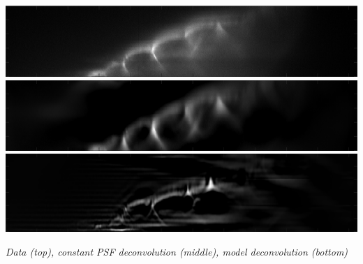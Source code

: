 \documentclass[a0paper,portrait,fontscale=0.35]{baposter}
\newcommand{\mycaption}[1]{
  {
    \smaller
    \emph{#1}
  }
}
\theoremstyle{plain}
\theoremstyle{plain}
\theoremstyle{definition}
\theoremstyle{plain}
\theoremstyle{definition}
\begin{document}
\begin{poster}
{\begin{minipage}[t]{0.48\textwidth}
\begin{minipage}[t]{0.49\textwidth}
      \centering
      \includegraphics[width=\textwidth]{img/f_xz1.png}
      \includegraphics[width=\textwidth]{img/urec_h_xz1.png}
      \includegraphics[width=\textwidth]{img/m_urec_it700_lam0p1_xz.png}

      \begin{center}
        \mycaption{
          Data (top), constant PSF deconvolution (middle),
          model deconvolution (bottom)
        }
      \end{center}
    \end{minipage}




\end{minipage}}
\end{poster}
\end{document}
